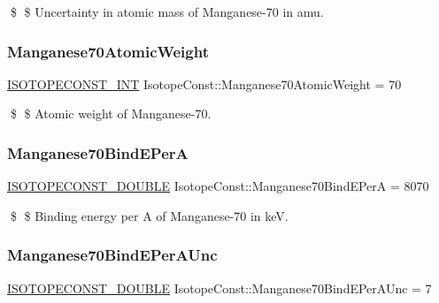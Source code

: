 \$ \$ Uncertainty in atomic mass of Manganese-\/70 in amu. \mbox{\label{group___isotope_const-_manganese-_mn70_ga61c786891685691be8194229265f90c8}} 
\subsubsection{\texorpdfstring{Manganese70\+Atomic\+Weight}{Manganese70AtomicWeight}}
{\footnotesize\ttfamily \mbox{\hyperlink{group___isotope_const-_macros_ga5f18360b3e99483a35c32d789e62621c}{I\+S\+O\+T\+O\+P\+E\+C\+O\+N\+S\+T\+\_\+\+I\+NT}} Isotope\+Const\+::\+Manganese70\+Atomic\+Weight = 70}

\$ \$ Atomic weight of Manganese-\/70. \mbox{\label{group___isotope_const-_manganese-_mn70_ga22fd72b15846ac7aa1b51e47caff60bb}} 
\subsubsection{\texorpdfstring{Manganese70\+Bind\+E\+PerA}{Manganese70BindEPerA}}
{\footnotesize\ttfamily \mbox{\hyperlink{group___isotope_const-_macros_ga8f45a7272ce02c0b4c65c44636ed719a}{I\+S\+O\+T\+O\+P\+E\+C\+O\+N\+S\+T\+\_\+\+D\+O\+U\+B\+LE}} Isotope\+Const\+::\+Manganese70\+Bind\+E\+PerA = 8070}

\$ \$ Binding energy per A of Manganese-\/70 in keV. \mbox{\label{group___isotope_const-_manganese-_mn70_ga7be0698a121cdd249326e70e09ba2e37}} 
\subsubsection{\texorpdfstring{Manganese70\+Bind\+E\+Per\+A\+Unc}{Manganese70BindEPerAUnc}}
{\footnotesize\ttfamily \mbox{\hyperlink{group___isotope_const-_macros_ga8f45a7272ce02c0b4c65c44636ed719a}{I\+S\+O\+T\+O\+P\+E\+C\+O\+N\+S\+T\+\_\+\+D\+O\+U\+B\+LE}} Isotope\+Const\+::\+Manganese70\+Bind\+E\+Per\+A\+Unc = 7}

